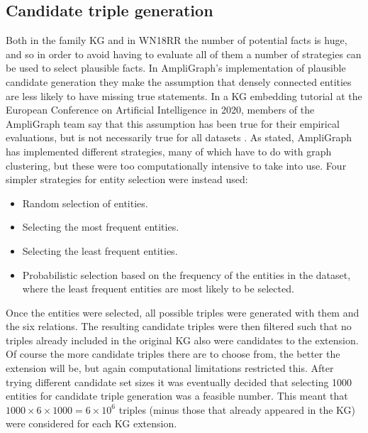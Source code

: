\subsection{Candidate triple generation}
Both in the family KG and in WN18RR the number of potential facts is huge, and so in order to avoid having to evaluate all of them a number of strategies can be used to select plausible facts. In AmpliGraph's implementation of plausible candidate generation they make the assumption that densely connected entities are less likely to have missing true statements. In a KG embedding tutorial at the European Conference on Artificial Intelligence in 2020, members of the AmpliGraph team say that this assumption has been true for their empirical evaluations, but is not necessarily true for all datasets \cite{nicholas_ampligraph_tutorial}.  As stated, AmpliGraph has implemented different strategies, many of which have to do with graph clustering, but these were too computationally intensive to take into use. Four simpler strategies for entity selection were instead used:
\begin{itemize}
    \item Random selection of entities.
    \item Selecting the most frequent entities.
    \item Selecting the least frequent entities.
    \item Probabilistic selection based on the frequency of the entities in the dataset, where the least frequent entities are most likely to be selected.
\end{itemize}
Once the entities were selected, all possible triples were generated with them and the six relations. The resulting candidate triples were then filtered such that no triples already included in the original KG also were candidates to the extension. Of course the more candidate triples there are to choose from, the better the extension will be, but again computational limitations restricted this.
After trying different candidate set sizes it was eventually decided that selecting 1000 entities for candidate triple generation was a feasible number. This meant that $ 1000 \times 6 \times 1000 = 6 \times 10^6 $ triples (minus those that already appeared in the KG) were considered for each KG extension.


